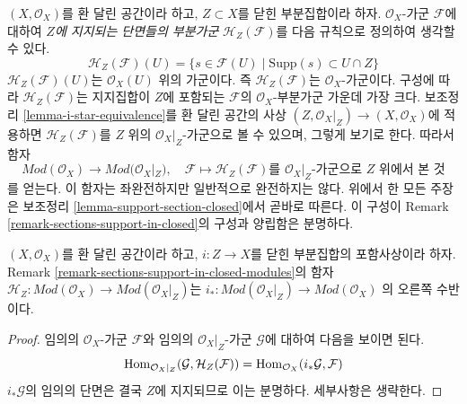 \begin{remark}
\label{remark-sections-support-in-closed-modules}
$(X, \mathcal{O}_X)$를 환 달린 공간이라 하고, $Z \subset X$를
닫힌 부분집합이라 하자. $\mathcal{O}_X$-가군 $\mathcal{F}$에 대하여
{\it $Z$에 지지되는 단면들의 부분가군} $\mathcal{H}_Z(\mathcal{F})$를
다음 규칙으로 정의하여 생각할 수 있다.
$$
\mathcal{H}_Z(\mathcal{F})(U) =
\{s \in \mathcal{F}(U) \mid \text{Supp}(s) \subset U \cap Z\}
$$
$\mathcal{H}_Z(\mathcal{F})(U)$는 $\mathcal{O}_X(U)$ 위의 가군이다.
즉 $\mathcal{H}_Z(\mathcal{F})$는 $\mathcal{O}_X$-가군이다.
구성에 따라 $\mathcal{H}_Z(\mathcal{F})$는 지지집합이 $Z$에 포함되는
$\mathcal{F}$의 $\mathcal{O}_X$-부분가군 가운데 가장 크다.
보조정리 \ref{lemma-i-star-equivalence}를 환 달린 공간의 사상
$(Z, \mathcal{O}_X|_Z) \to (X, \mathcal{O}_X)$에 적용하면
$\mathcal{H}_Z(\mathcal{F})$를 $Z$ 위의 $\mathcal{O}_X|_Z$-가군으로
볼 수 있으며, 그렇게 보기로 한다. 따라서 함자
$$
\textit{Mod}(\mathcal{O}_X) \longrightarrow \textit{Mod}(\mathcal{O}_X|_Z),
\quad
\mathcal{F} \longmapsto \mathcal{H}_Z(\mathcal{F})
\text{를 }\mathcal{O}_X|_Z\text{-가군으로 }Z\text{ 위에서 본 것}
$$
를 얻는다. 이 함자는 좌완전하지만 일반적으로 완전하지는 않다.
위에서 한 모든 주장은 보조정리 \ref{lemma-support-section-closed}에서
곧바로 따른다. 이 구성이 Remark \ref{remark-sections-support-in-closed}의
구성과 양립함은 분명하다.
\end{remark}

\begin{lemma}
\label{lemma-adjoint-section-with-support}
$(X, \mathcal{O}_X)$를 환 달린 공간이라 하고, $i : Z \to X$를
닫힌 부분집합의 포함사상이라 하자. Remark
\ref{remark-sections-support-in-closed-modules}의 함자
$\mathcal{H}_Z : \textit{Mod}(\mathcal{O}_X) \to
\textit{Mod}(\mathcal{O}_X|_Z)$는
$i_* : \textit{Mod}(\mathcal{O}_X|_Z) \to \textit{Mod}(\mathcal{O}_X)$
의 오른쪽 수반이다.
\end{lemma}

\begin{proof}
임의의 $\mathcal{O}_X$-가군 $\mathcal{F}$와 임의의
$\mathcal{O}_X|_Z$-가군 $\mathcal{G}$에 대하여 다음을 보이면 된다.
$$
\mathop{\mathrm{Hom}}\nolimits_{\mathcal{O}_X|_Z}(\mathcal{G}, \mathcal{H}_Z(\mathcal{F})) =
\mathop{\mathrm{Hom}}\nolimits_{\mathcal{O}_X}(i_*\mathcal{G}, \mathcal{F})
$$
$i_*\mathcal{G}$의 임의의 단면은 결국 $Z$에 지지되므로 이는 분명하다.
세부사항은 생략한다.
\end{proof}










